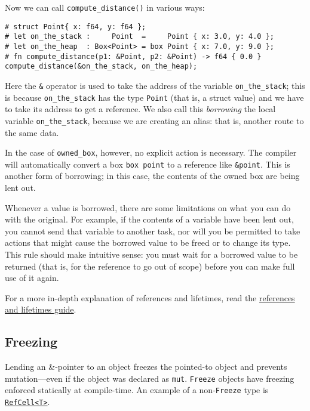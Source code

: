 \documentclass[]{article}
\begin{document}
Now we can call \texttt{compute\_distance()} in various ways:

\begin{verbatim}
# struct Point{ x: f64, y: f64 };
# let on_the_stack :     Point  =     Point { x: 3.0, y: 4.0 };
# let on_the_heap  : Box<Point> = box Point { x: 7.0, y: 9.0 };
# fn compute_distance(p1: &Point, p2: &Point) -> f64 { 0.0 }
compute_distance(&on_the_stack, on_the_heap);
\end{verbatim}

Here the \texttt{\&} operator is used to take the address of the
variable \texttt{on\_the\_stack}; this is because
\texttt{on\_the\_stack} has the type \texttt{Point} (that is, a struct
value) and we have to take its address to get a reference. We also call
this \emph{borrowing} the local variable \texttt{on\_the\_stack},
because we are creating an alias: that is, another route to the same
data.

In the case of \texttt{owned\_box}, however, no explicit action is
necessary. The compiler will automatically convert a box
\texttt{box point} to a reference like \texttt{\&point}. This is another
form of borrowing; in this case, the contents of the owned box are being
lent out.

Whenever a value is borrowed, there are some limitations on what you can
do with the original. For example, if the contents of a variable have
been lent out, you cannot send that variable to another task, nor will
you be permitted to take actions that might cause the borrowed value to
be freed or to change its type. This rule should make intuitive sense:
you must wait for a borrowed value to be returned (that is, for the
reference to go out of scope) before you can make full use of it again.

For a more in-depth explanation of references and lifetimes, read the
\href{guide-lifetimes.html}{references and lifetimes guide}.

\subsection{Freezing}\label{freezing}

Lending an \&-pointer to an object freezes the pointed-to object and
prevents mutation---even if the object was declared as \texttt{mut}.
\texttt{Freeze} objects have freezing enforced statically at
compile-time. An example of a non-\texttt{Freeze} type is
\href{http://doc.rust-lang.org/std/cell/struct.RefCell.html}{\texttt{RefCell\textless{}T\textgreater{}}}.
\end{document}
